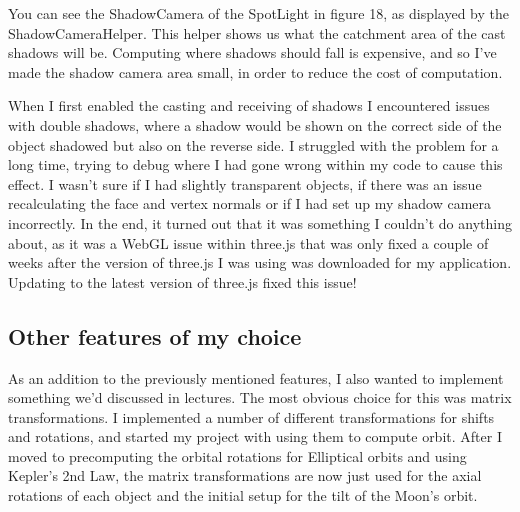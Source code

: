 \documentclass[12pt]{article}
\begin{document}
You can see the ShadowCamera of the SpotLight in figure 18, as displayed by the ShadowCameraHelper. This helper shows us what the catchment area of the cast shadows will be. Computing where shadows should fall is expensive, and so I've made the shadow camera area small, in order to reduce the cost of computation.

When I first enabled the casting and receiving of shadows I encountered issues with double shadows, where a shadow would be shown on the correct side of the object shadowed but also on the reverse side. I struggled with the problem for a long time, trying to debug where I had gone wrong within my code to cause this effect. I wasn't sure if I had slightly transparent objects, if there was an issue recalculating the face and vertex normals or if I had set up my shadow camera incorrectly. In the end, it turned out that it was something I couldn't do anything about, as it was a WebGL issue\cite{shadow1}\cite{shadow2} within three.js that was only fixed a couple of weeks after the version of three.js I was using was downloaded for my application. Updating to the latest version of three.js fixed this issue!

\subsection{Other features of my choice}
As an addition to the previously mentioned features, I also wanted to implement something we'd discussed in lectures. The most obvious choice for this was matrix transformations. I implemented a number of different transformations for shifts and rotations, and started my project with using them to compute orbit. After I moved to precomputing the orbital rotations for Elliptical orbits and using Kepler's 2nd Law, the matrix transformations are now just used for the axial rotations of each object and the initial setup for the tilt of the Moon's orbit.
\end{document}
